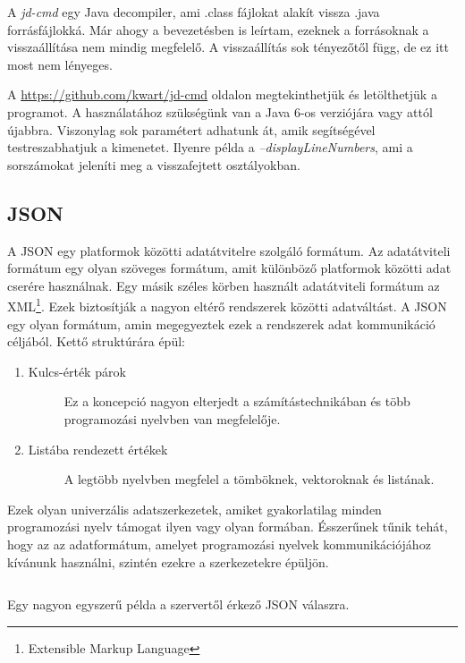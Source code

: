 \documentclass{thesis-ekf}
\theoremstyle{definition}
\theoremstyle{remark}
\begin{document}
A \emph{jd-cmd} egy Java decompiler, ami .class fájlokat alakít vissza .java forrásfájlokká.
Már ahogy a bevezetésben is leírtam, ezeknek a forrásoknak a visszaállítása nem mindig megfelelő.
A visszaállítás sok tényezőtől függ, de ez itt most nem lényeges.

A \url{https://github.com/kwart/jd-cmd} oldalon megtekinthetjük és letölthetjük a programot.
A használatához szükségünk van a Java 6-os verziójára vagy attól újabbra.
Viszonylag sok paramétert adhatunk át, amik segítségével testreszabhatjuk a kimenetet.
Ilyenre példa a \emph{--displayLineNumbers}, ami a sorszámokat jeleníti meg a visszafejtett osztályokban.

\subsection{JSON}

A JSON egy platformok közötti adatátvitelre szolgáló formátum.
Az adatátviteli formátum egy olyan szöveges formátum, amit különböző platformok közötti adat cserére használnak.
Egy másik széles körben használt adatátviteli formátum az XML\footnote{Extensible Markup Language}.
Ezek biztosítják a nagyon eltérő rendszerek közötti adatváltást.
A JSON egy olyan formátum, amin megegyeztek ezek a rendszerek adat kommunikáció céljából. \cite{json1}
Kettő struktúrára épül:

\begin{enumerate}
	\item
	\begin{description}
		\item[Kulcs-érték párok] Ez a koncepció nagyon elterjedt a számítástechnikában és több programozási nyelvben van megfelelője. 
	\end{description}
	\item
	\begin{description}
		\item[Listába rendezett értékek] A legtöbb nyelvben megfelel a tömböknek, vektoroknak és listának.
	\end{description}
\end{enumerate}

Ezek olyan univerzális adatszerkezetek, amiket gyakorlatilag minden programozási nyelv támogat ilyen vagy olyan formában.
Ésszerűnek tűnik tehát, hogy az az adatformátum, amelyet programozási nyelvek kommunikációjához kívánunk használni, szintén ezekre a szerkezetekre épüljön.\cite{json2}

\begin{listing}[ht]
	\inputminted[linenos=true]{json}{./codes/result.json}
	\caption{Egy nagyon egyszerű példa a szervertől érkező JSON válaszra.}
	\label{json_example}
\end{listing}
\end{document}
